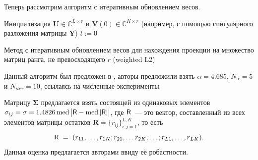 \documentclass[specialist,
               substylefile = spbu.rtx,
               subf,href,colorlinks=true, 12pt]{disser}
\DeclareMathOperator{\med}{med}
\begin{document}
Теперь рассмотрим алгоритм с итеративным обновлением весов.

\begin{algorithm}[H]
\SetAlgoLined
{}
 Инициализация $\mathbf{U} \in \mathbb{C}^{L\times r}$ и $\mathbf{V}(0) \in \mathbb{C}^{K\times r}$ (например, с помощью сингулярного разложения матрицы $\mathbf{Y}$)\;
 $t := 0$\;
 \caption{Метод с итеративным обновлением весов для нахождения проекции на множество матриц ранга, не превосходящего $r$ (weighted L2)}
\end{algorithm}

Данный алгоритм был предложен в \cite{Chen}, авторы предложили взять $\alpha = 4.685$, $N_{\alpha} = 5$ и $N_{iter} = 10$, ссылаясь на численные эксперименты.

Матрицу $\mathbf{\Sigma}$ предлагается взять состоящей из одинаковых элементов $\sigma_{ij} = \sigma = 1.4826 \med {\big|\tR-\med {|\tR|}\big|}$, где $\textsf{R}$~--- это вектор, составленный из всех элементов матрицы остатков $\mathbf{R} = \{r_{ij}\}_{i,j=1}^{L,K}$, то есть
\begin{equation*}
	\textsf{R}~=~(r_{11},\ldots,r_{1K}; r_{21},\ldots r_{2K};\ldots;r_{L1},\ldots,r_{LK}).
\end{equation*}
Данная оценка предлагается авторами ввиду её робастности.
\end{document}
